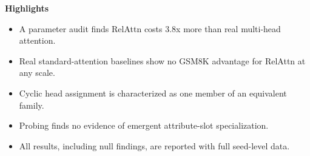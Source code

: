 \documentclass[review]{elsarticle}
\begin{document}
\begin{center}
\textbf{Highlights}
\end{center}
\begin{itemize}[leftmargin=*]
\item A parameter audit finds RelAttn costs 3.8x more than real multi-head attention.
\item Real standard-attention baselines show no GSM8K advantage for RelAttn at any scale.
\item Cyclic head assignment is characterized as one member of an equivalent family.
\item Probing finds no evidence of emergent attribute-slot specialization.
\item All results, including null findings, are reported with full seed-level data.
\end{itemize}
\end{document}
